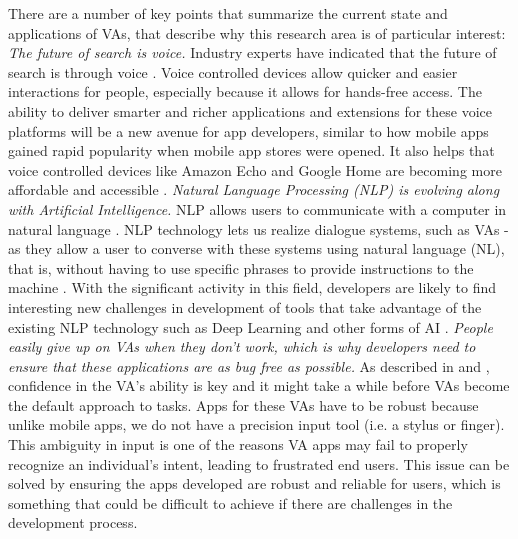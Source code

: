 \documentclass{sigchi}
\begin{document}
There are a number of key points that summarize the current state and applications of VAs, that describe why this research area is of particular interest:
\newline
\textit{The future of search is voice.}
Industry experts have indicated that the future of search is through voice \cite{9Enge}. Voice controlled devices allow quicker and easier interactions for people, especially because it allows for hands-free access. The ability to deliver smarter and richer applications and extensions for these voice platforms will be a new avenue for app developers, similar to how mobile apps gained rapid popularity when mobile app stores were opened. It also helps that voice controlled devices like Amazon Echo and Google Home are becoming more affordable and accessible \cite{10googlehome}\cite{11alexa}.
\newline
\textit{Natural Language Processing (NLP) is evolving along with Artificial Intelligence.}
NLP allows users to communicate with a computer in natural language \cite{12khurana2017natural}. NLP technology lets us realize dialogue systems, such as VAs - as they allow a user to converse with these systems using natural language (NL), that is, without having to use specific phrases to provide instructions to the machine \cite{12khurana2017natural}. With the significant activity in this field, developers are likely to find interesting new challenges in development of tools that take advantage of the existing NLP technology such as Deep Learning and other forms of AI \cite{deng2013new}.
 \newline
\textit{People easily give up on VAs when they don’t work, which is why developers need to ensure that these applications are as bug free as possible.}
As described in \cite{13Paul} and \cite{14Barnes}, confidence in the VA’s ability is key and it might take a while before VAs become the default approach to tasks. Apps for these VAs have to be robust because unlike mobile apps, we do not have a precision input tool (i.e. a stylus or finger). This ambiguity in input is one of the reasons VA apps may fail to properly recognize an individual's intent, leading to frustrated end users. This issue can be solved by ensuring the apps developed are robust and reliable for users, which is something that could be difficult to achieve if there are challenges in the development process.
\end{document}
